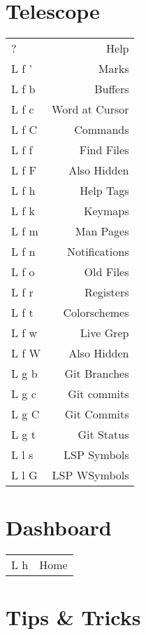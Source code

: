 \documentclass[
  ,landscape
  ,columns=4
]{cheatsheet}
\begin{document}
\section{Telescope}

\begin{tabular}{lr}
	?     & Help           \\
	L f ' & Marks          \\
	L f b & Buffers        \\
	L f c & Word at Cursor \\
	L f C & Commands       \\
	L f f & Find Files     \\
	L f F & Also Hidden    \\
	L f h & Help Tags      \\
	L f k & Keymaps        \\
	L f m & Man Pages      \\
	L f n & Notifications  \\
	L f o & Old Files      \\
	L f r & Registers      \\
	L f t & Colorschemes   \\
	L f w & Live Grep      \\
	L f W & Also Hidden    \\
	L g b & Git Branches   \\
	L g c & Git commits    \\
	L g C & Git Commits    \\
	L g t & Git Status     \\
	L l s & LSP Symbols    \\
	L l G & LSP WSymbols   \\
\end{tabular}

\section{Dashboard}

\begin{tabular}{lr}
	L h & Home \\
\end{tabular}

\section{Tips \& Tricks}
\end{document}

